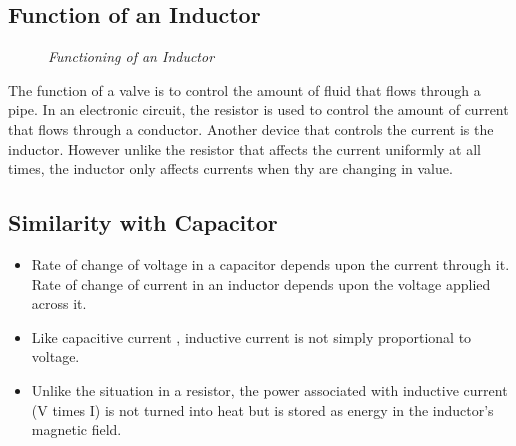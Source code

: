 		\subsection{Function of an Inductor}
			\begin{figure}[ht]
				\centering 
				\hfill
				\hfill
				\caption{\textit{Functioning of an Inductor}}
			\end{figure}
		
			The function of a valve is to control the amount of fluid that flows through a pipe. In an electronic circuit, the resistor is used to control the amount of current that flows through a conductor. Another device that controls the current is the inductor. However unlike the resistor that affects the current uniformly at all times, the inductor only affects currents when thy are changing in value.
		
		\subsection{Similarity with Capacitor}
			\begin{itemize}
				\tightlist
				\item Rate of change of voltage in a capacitor depends upon the current through it. Rate of change of current in an inductor depends upon the voltage applied across it.
				\item Like capacitive current , inductive current is not simply proportional to voltage.
				\item Unlike the situation in a resistor, the power associated with inductive current (V times I) is not turned into heat but is stored as energy in the inductor’s magnetic field.
			\end{itemize}
		
